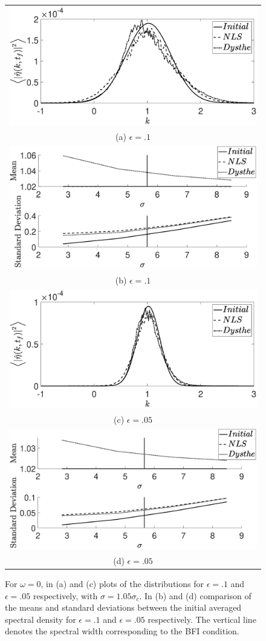 \documentclass[a4paper,11pt]{article}
\begin{document}
\begin{figure}[!ht]
\centering
\begin{tabular}{c}
\includegraphics[width=.65\textwidth]{pdf_w_0_ep_pt1_Nens_512} \\
(a) $\epsilon=.1$\\
\includegraphics[width=.65\textwidth]{omega_0_mean_std_plot_ep_pt1}\\
(b) $\epsilon=.1$ \\
\includegraphics[width=.65\textwidth]{pdf_w_0_ep_pt05_Nens_512}\\
(c) $\epsilon=.05$ \\
\includegraphics[width=.65\textwidth]{omega_0_mean_std_plot_ep_pt05}\\
(d) $\epsilon=.05$
\end{tabular}
\caption{For $\omega=0$, in (a) and (c) plots of the distributions for $\epsilon=.1$ and $\epsilon=.05$ respectively,  with $\sigma=1.05\sigma_{c}$.  In (b) and (d) comparison of the means and standard deviations between the initial averaged spectral density for $\epsilon=.1$ and $\epsilon=.05$ respectively.  The vertical line denotes the spectral width corresponding to the BFI condition.}
\label{fig:meanstdom0}
\end{figure}
\end{document}
